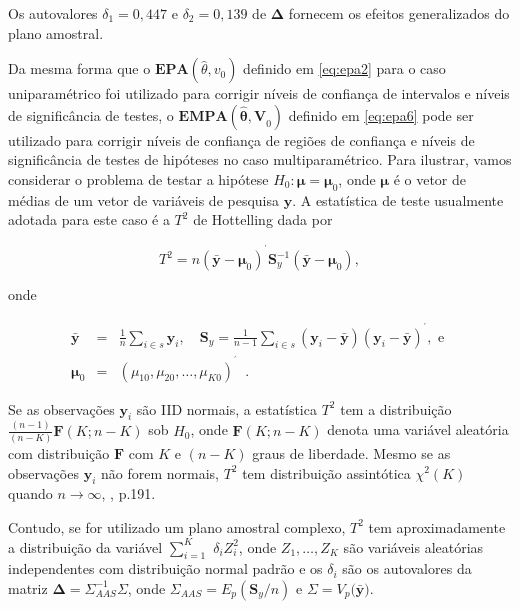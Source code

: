 \documentclass[]{book}
\theoremstyle{definition}
\theoremstyle{definition}
\theoremstyle{definition}
\theoremstyle{remark}
\begin{document}
Os autovalores \(\delta_{1}=0,447\) e \(\delta_{2}=0,139\) de
\(\mathbf{\Delta}\) fornecem os efeitos generalizados do plano amostral.

Da mesma forma que o \(\mathbf{EPA}\left( \hat{\theta},v_{0}\right)\)
definido em \eqref{eq:epa2} para o caso uniparamétrico foi utilizado para
corrigir níveis de confiança de intervalos e níveis de significância de
testes, o \(\mathbf{EMPA}(\mathbf{\hat{\theta},V}_{0})\) definido em
\eqref{eq:epa6} pode ser utilizado para corrigir níveis de confiança de
regiões de confiança e níveis de significância de testes de hipóteses no
caso multiparamétrico. Para ilustrar, vamos considerar o problema de
testar a hipótese \(H_{0}:\mathbf{\mu }=\mathbf{\mu }_{0}\), onde
\(\mathbf{\mu }\) é o vetor de médias de um vetor de variáveis de
pesquisa \(\mathbf{y}\). A estatística de teste usualmente adotada para
este caso é a \(T^{2}\) de Hottelling dada por

\begin{equation}
T^{2}=n\left( \mathbf{\bar{y}-\mu }_{0}\right) ^{^{\prime }}\mathbf{S}
_{y}^{-1}\left( \mathbf{\bar{y}-\mu }_{0}\right) , \label{eq:epa11} 
\end{equation}

onde

\begin{eqnarray*}
\mathbf{\bar{y}} &=&\frac{1}{n}\sum\limits_{i\in s}\mathbf{y}_{i},\quad 
\mathbf{S}_{y}=\frac{1}{n-1}\sum\limits_{i\in s}\left( \mathbf{y}_{i}-
\mathbf{\bar{y}}\right) \left( \mathbf{y}_{i}-\mathbf{\bar{y}}\right)
^{^{\prime }},\mbox{ e } \\
\mathbf{\mu }_{0} &=&\left( \mu _{10},\mu _{20},\ldots ,\mu _{K0}\right)
^{^{\prime }}\;\;.
\end{eqnarray*}

Se as observações \(\mathbf{y}_{i}\) são IID normais, a estatística
\(T^{2}\) tem a distribuição
\(\frac{\left( n-1\right) }{\left( n-K\right)}\mathbf{F}\left( K;n-K\right)\)
sob \(H_{0}\), onde \(\mathbf{F}\left( K;n-K\right)\) denota uma
variável aleatória com distribuição \(\mathbf{F}\) com \(K\) e
\(\left( n-K\right)\) graus de liberdade. Mesmo se as observações
\(\mathbf{y}_{i}\) não forem normais, \(T^{2}\) tem distribuição
assintótica \(\chi ^{2}\left(K\right)\) quando \(n\rightarrow \infty\),
\citep{Johnson}, p.191.

Contudo, se for utilizado um plano amostral complexo, \(T^{2}\) tem
aproximadamente a distribuição da variável \(\sum\limits_{i=1}^{K}\)
\(\delta _{i}Z_{i}^{2}\), onde \(Z_{1},\ldots ,Z_{K}\) são variáveis
aleatórias independentes com distribuição normal padrão e os
\(\delta _{i}\) são os autovalores da matriz
\(\mathbf{\Delta }=\Sigma _{AAS}^{-1}\Sigma\), onde
\(\Sigma _{AAS}=E_{p}(\mathbf{S}_{y}/n)\) e
\(\Sigma =V_{p}(\mathbf{\bar{y})}\).
\end{document}
